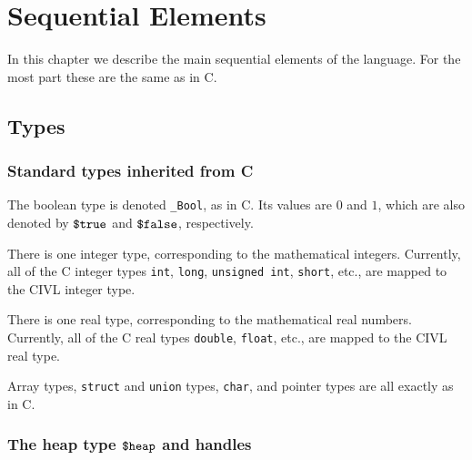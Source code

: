 








\chapter{Sequential Elements}

In this chapter we describe the main sequential elements of the
language.  For the most part these are the same as in C.

\section{Types}

\subsection{Standard types inherited from C}

The boolean type is denoted \verb!_Bool!, as in C. Its values are $0$
and $1$, which are also denoted by $\mbox{\texttt{\${}true}}$ and $\mbox{\texttt{\${}false}}$,
respectively.

There is one integer type, corresponding to the mathematical integers.
Currently, all of the C integer types \texttt{int}, \texttt{long},
\texttt{unsigned\ int}, \texttt{short}, etc., are mapped to the CIVL
integer type.

There is one real type, corresponding to the mathematical real
numbers. Currently, all of the C real types \texttt{double},
\texttt{float}, etc., are mapped to the CIVL real type.

Array types, \texttt{struct} and \texttt{union} types, \texttt{char},
and pointer types are all exactly as in C.

\subsection{The heap type $\mbox{\texttt{\${}heap}}$ and handles}

